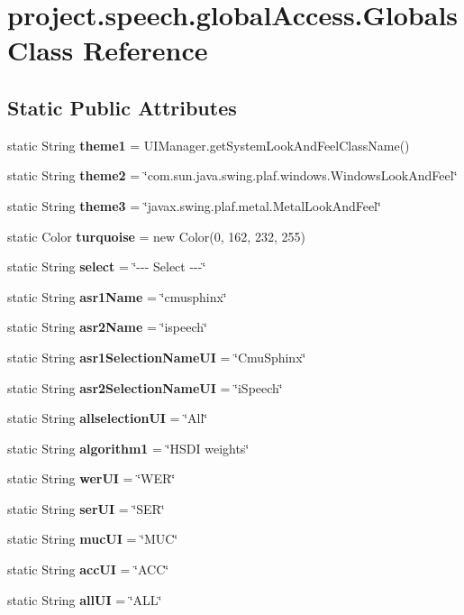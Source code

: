 \section{project.\+speech.\+global\+Access.\+Globals Class Reference}
\label{classproject_1_1speech_1_1global_access_1_1_globals}
\subsection*{Static Public Attributes}
\begin{DoxyCompactItemize}
\item 
static String {\bf theme1} = U\+I\+Manager.\+get\+System\+Look\+And\+Feel\+Class\+Name()
\item 
static String {\bf theme2} = \char`\"{}com.\+sun.\+java.\+swing.\+plaf.\+windows.\+Windows\+Look\+And\+Feel\char`\"{}
\item 
static String {\bf theme3} = \char`\"{}javax.\+swing.\+plaf.\+metal.\+Metal\+Look\+And\+Feel\char`\"{}
\item 
static Color {\bf turquoise} = new Color(0, 162, 232, 255)
\item 
static String {\bf select} = \char`\"{}-\/-\/-\/ Select -\/-\/-\/\char`\"{}
\item 
static String {\bf asr1\+Name} = \char`\"{}cmusphinx\char`\"{}
\item 
static String {\bf asr2\+Name} = \char`\"{}ispeech\char`\"{}
\item 
static String {\bf asr1\+Selection\+Name\+U\+I} = \char`\"{}Cmu\+Sphinx\char`\"{}
\item 
static String {\bf asr2\+Selection\+Name\+U\+I} = \char`\"{}i\+Speech\char`\"{}
\item 
static String {\bf allselection\+U\+I} = \char`\"{}All\char`\"{}
\item 
static String {\bf algorithm1} = \char`\"{}H\+S\+D\+I weights\char`\"{}
\item 
static String {\bf wer\+U\+I} = \char`\"{}W\+E\+R\char`\"{}
\item 
static String {\bf ser\+U\+I} = \char`\"{}S\+E\+R\char`\"{}
\item 
static String {\bf muc\+U\+I} = \char`\"{}M\+U\+C\char`\"{}
\item 
static String {\bf acc\+U\+I} = \char`\"{}A\+C\+C\char`\"{}
\item 
static String {\bf all\+U\+I} = \char`\"{}A\+L\+L\char`\"{}
\item 

\end{DoxyCompactItemize}
